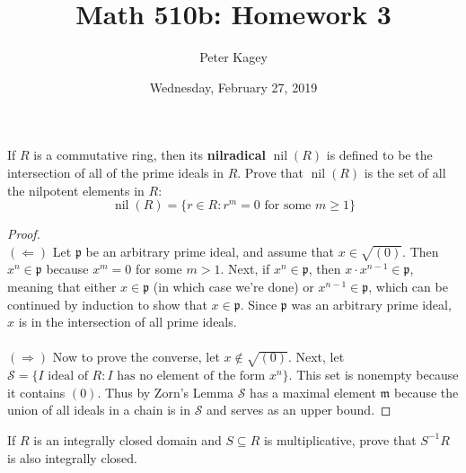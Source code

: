 \documentclass{article}
\newenvironment{problem}[2][Problem]{\begin{trivlist}
\item[\hskip \labelsep {\bfseries #1}\hskip \labelsep {\bfseries #2.}]}{\end{trivlist}}
\newcommand{\set}[1]{\{ #1 \}}
\begin{document}
\title{Math 510b: Homework 3}
\author{Peter Kagey}
\date{Wednesday, February 27, 2019}

\maketitle

\begin{problem}{5.57 (Rotman)} %
  If $R$ is a commutative ring, then its \textbf{nilradical}
  $\operatorname{nil}(R)$ is defined to be the intersection of all of the prime
  ideals in $R$. Prove that $\operatorname{nil}(R)$ is the set of all the
  nilpotent elements in $R$: \[
    \operatorname{nil}(R) = \set{r \in R : r^m = 0 \text{ for some } m \geq 1}
  \]
\end{problem}

\begin{proof} ~ \\
  $(\Longleftarrow)$ Let $\mathfrak p$ be an arbitrary prime ideal, and assume
  that $x \in \sqrt{(0)}$. Then $x^n \in \mathfrak p$ because $x^m = 0$ for some
  $m > 1$. Next, if $x^n \in \mathfrak p$, then $x \cdot x^{n-1} \in \mathfrak p$,
  meaning that either $x \in \mathfrak p$ (in which case we're done) or
  $x^{n-1} \in \mathfrak p$, which can be continued by induction to show that
  $x \in \mathfrak p$. Since $\mathfrak p$ was an arbitrary prime ideal, $x$ is
  in the intersection of all prime ideals.
  \\~\\ %
  $(\Longrightarrow)$ Now to prove the converse, let $x \not\in \sqrt{(0)}$.
  Next, let $\mathcal S = \set{I \text{ ideal of } R : I \text{ has no element of the form } x^n}$.
  This set is nonempty because it contains $(0)$.
  Thus by Zorn's Lemma $\mathcal S$ has a maximal element $\mathfrak m$ because
  the union of all ideals in a chain is in $\mathcal S$ and serves as an upper
  bound.
\end{proof}
\pagebreak
\begin{problem}{10.27 (Rotman)} %
  If $R$ is an integrally closed domain and $S \subseteq R$ is multiplicative,
  prove that $S^{-1}R$ is also integrally closed.
\end{problem}
\end{document}
